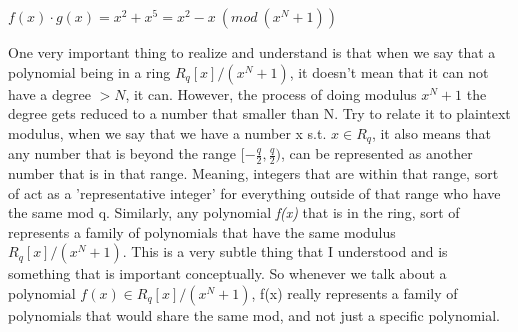 \documentclass{report}
\begin{document}
		\begin{center}
			$f(x) \cdot g(x) = x^2 + x^5 = x^2 - x \: (mod \: (x^N + 1))$
		\end{center}
		
		One very important thing to realize and understand is that when we say that a polynomial being in a ring $R_q[x]/(x^N + 1)$, it doesn't mean that it can not have a degree $> N$, it can. However, the process of doing modulus $x^N + 1$ the degree gets reduced to a number that smaller than N. Try to relate it to plaintext modulus, when we say that we have a number x s.t. $x \in R_q$,  it also means that any number that is beyond the range $[-\frac{q}{2}, \frac{q}{2})$, can be represented as another number that is in that range. Meaning, integers that are within that range, sort of act as a 'representative integer' for everything outside of that range who have the same mod q. Similarly, any polynomial \textit{f(x)} that is in the ring, sort of represents a family of polynomials that have the same modulus $R_q[x]/(x^N + 1)$. This is a very subtle thing that I understood and is something that is important conceptually. So whenever we talk about a polynomial $f(x) \in R_q[x]/(x^N + 1)$, f(x) really represents a family of polynomials that would share the same mod, and not just a specific polynomial.
\end{document}
